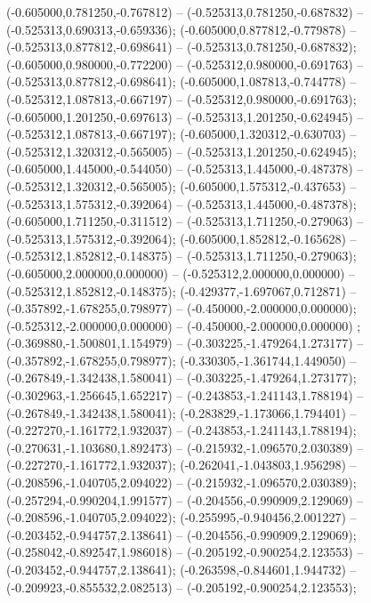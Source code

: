  (-0.605000,0.781250,-0.767812) -- (-0.525313,0.781250,-0.687832) -- (-0.525313,0.690313,-0.659336);
 (-0.605000,0.877812,-0.779878) -- (-0.525313,0.877812,-0.698641) -- (-0.525313,0.781250,-0.687832);
 (-0.605000,0.980000,-0.772200) -- (-0.525312,0.980000,-0.691763) -- (-0.525313,0.877812,-0.698641);
 (-0.605000,1.087813,-0.744778) -- (-0.525312,1.087813,-0.667197) -- (-0.525312,0.980000,-0.691763);
 (-0.605000,1.201250,-0.697613) -- (-0.525313,1.201250,-0.624945) -- (-0.525312,1.087813,-0.667197);
 (-0.605000,1.320312,-0.630703) -- (-0.525312,1.320312,-0.565005) -- (-0.525313,1.201250,-0.624945);
 (-0.605000,1.445000,-0.544050) -- (-0.525313,1.445000,-0.487378) -- (-0.525312,1.320312,-0.565005);
 (-0.605000,1.575312,-0.437653) -- (-0.525313,1.575312,-0.392064) -- (-0.525313,1.445000,-0.487378);
 (-0.605000,1.711250,-0.311512) -- (-0.525313,1.711250,-0.279063) -- (-0.525313,1.575312,-0.392064);
 (-0.605000,1.852812,-0.165628) -- (-0.525312,1.852812,-0.148375) -- (-0.525313,1.711250,-0.279063);
 (-0.605000,2.000000,0.000000) -- (-0.525312,2.000000,0.000000) -- (-0.525312,1.852812,-0.148375);
 (-0.429377,-1.697067,0.712871) -- (-0.357892,-1.678255,0.798977) -- (-0.450000,-2.000000,0.000000);
 (-0.525312,-2.000000,0.000000) -- (-0.450000,-2.000000,0.000000) ;
 (-0.369880,-1.500801,1.154979) -- (-0.303225,-1.479264,1.273177) -- (-0.357892,-1.678255,0.798977);
 (-0.330305,-1.361744,1.449050) -- (-0.267849,-1.342438,1.580041) -- (-0.303225,-1.479264,1.273177);
 (-0.302963,-1.256645,1.652217) -- (-0.243853,-1.241143,1.788194) -- (-0.267849,-1.342438,1.580041);
 (-0.283829,-1.173066,1.794401) -- (-0.227270,-1.161772,1.932037) -- (-0.243853,-1.241143,1.788194);
 (-0.270631,-1.103680,1.892473) -- (-0.215932,-1.096570,2.030389) -- (-0.227270,-1.161772,1.932037);
 (-0.262041,-1.043803,1.956298) -- (-0.208596,-1.040705,2.094022) -- (-0.215932,-1.096570,2.030389);
 (-0.257294,-0.990204,1.991577) -- (-0.204556,-0.990909,2.129069) -- (-0.208596,-1.040705,2.094022);
 (-0.255995,-0.940456,2.001227) -- (-0.203452,-0.944757,2.138641) -- (-0.204556,-0.990909,2.129069);
 (-0.258042,-0.892547,1.986018) -- (-0.205192,-0.900254,2.123553) -- (-0.203452,-0.944757,2.138641);
 (-0.263598,-0.844601,1.944732) -- (-0.209923,-0.855532,2.082513) -- (-0.205192,-0.900254,2.123553);

